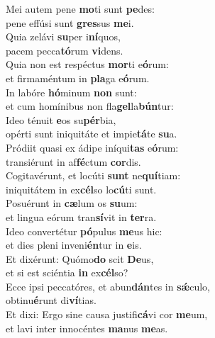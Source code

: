 \evenverse Mei autem pene \textbf{mo}ti sunt \textbf{pe}des:~\*\\
\evenverse pene effúsi sunt \textbf{gres}sus \textbf{me}i.\\
\oddverse Quia zelávi \textbf{su}per i\textbf{ní}quos,~\*\\
\oddverse pacem pecca\textbf{tó}rum \textbf{vi}dens.\\
\evenverse Quia non est respéctus \textbf{mor}ti e\textbf{ó}rum:~\*\\
\evenverse et firmaméntum in \textbf{pla}ga e\textbf{ó}rum.\\
\oddverse In labóre \textbf{hó}minum \textbf{non} sunt:~\*\\
\oddverse et cum homínibus non fla\textbf{gel}la\textbf{bún}tur:\\
\evenverse Ideo ténuit \textbf{e}os su\textbf{pér}bia,~\*\\
\evenverse opérti sunt iniquitáte et impie\textbf{tá}te \textbf{su}a.\\
\oddverse Pródiit quasi ex ádipe iníqui\textbf{tas} e\textbf{ó}rum:~\*\\
\oddverse transiérunt in af\textbf{fé}ctum \textbf{cor}dis.\\
\evenverse Cogitavérunt, et locúti \textbf{sunt} ne\textbf{quí}tiam:~\*\\
\evenverse iniquitátem in ex\textbf{cél}so lo\textbf{cú}ti sunt.\\
\oddverse Posuérunt in \textbf{cæ}lum os \textbf{su}um:~\*\\
\oddverse et lingua eórum tran\textbf{sí}vit in \textbf{ter}ra.\\
\evenverse Ideo convertétur \textbf{pó}pulus \textbf{me}us hic:~\*\\
\evenverse et dies pleni inveni\textbf{én}tur in \textbf{e}is.\\
\oddverse Et dixérunt: Quómo\textbf{do} scit \textbf{De}us,~\*\\
\oddverse et si est sciéntia \textbf{in} ex\textbf{cél}so?\\
\evenverse Ecce ipsi peccatóres, et abun\textbf{dán}tes in \textbf{sǽ}culo,~\*\\
\evenverse obtinu\textbf{é}runt di\textbf{ví}tias.\\
\oddverse Et dixi: Ergo sine causa justifi\textbf{cá}vi cor \textbf{me}um,~\*\\
\oddverse et lavi inter innocéntes \textbf{ma}nus \textbf{me}as.\\

